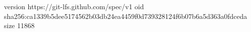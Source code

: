 version https://git-lfs.github.com/spec/v1
oid sha256:ca1339b5dee5174562b03db24ea4459f0d739328124f6b07b6a5d363a0fdceda
size 11868
